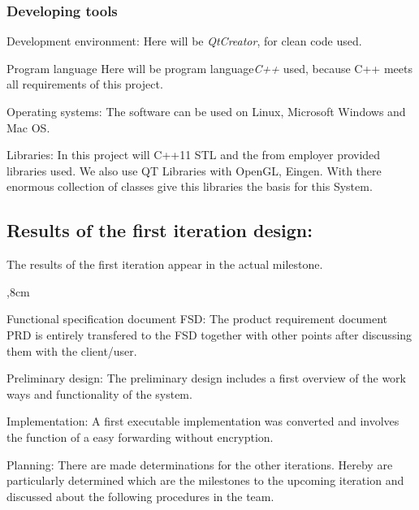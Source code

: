 \subsubsection{Developing tools}
	\begin{aims}
		
		\item[Development environment:] Here will be \textit{QtCreator}, for clean code used.
		
		\item[Program language] Here will be program language\textit{C++} used, because C++ meets all requirements of this project.
		
		\item[Operating systems:] The software can be used on Linux, Microsoft Windows and Mac OS.
		
		\item[Libraries:] In this project will C++11 STL and the from employer provided libraries used. 
		We also use QT Libraries with OpenGL, Eingen.
		With there enormous collection of classes  give this libraries the basis for this System. 
		
	\end{aims}

\subsection{Results of the first iteration design:}
The results of the first iteration appear in the actual milestone. 
\begin{aims}
	,8cm
		\item[Functional specification document FSD:] The product requirement document PRD is entirely transfered to the FSD together with other points after discussing them with the client/user.
		
	    \item[Preliminary design:] The preliminary design includes a first overview of the work ways and functionality of the system. 
		
		\item[Implementation:] A first executable implementation was converted and involves the function of a easy forwarding without encryption. 
		
		\item[Planning:] There are made determinations for the other iterations. Hereby are particularly determined which are the milestones to the upcoming iteration and discussed about the following procedures in the team. 
		
		
	\end{aims}

